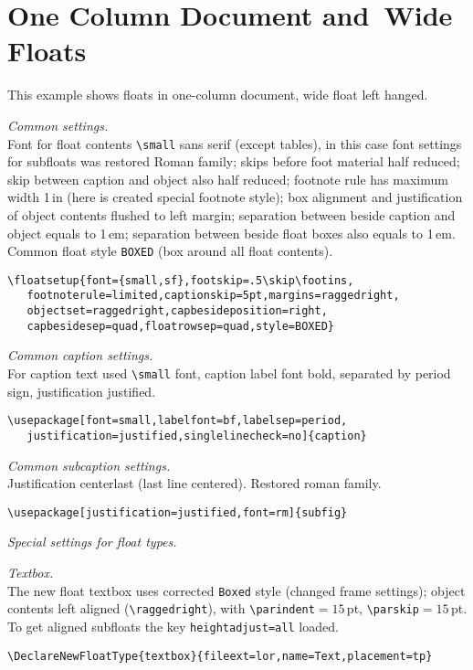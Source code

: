 \documentclass{book}
\begin{document}
\chapter{One Column Document and~Wide Floats}

\begin{sl}
This example shows floats in one-column document, wide float left hanged.

\emph{Common settings.}\\
Font for float contents \verb|\small| sans serif (except tables),
in this case font settings for subfloats was restored Roman family;
skips before foot material half reduced;
skip between caption and object also half reduced;
footnote rule has maximum width 1\,in (here is created special footnote style);
box alignment and justification of object contents flushed to left margin;
separation between beside caption and object equals to 1\,em; separation
between beside float boxes also equals to 1\,em. Common float style
\texttt{BOXED} (box around all float contents).
\begin{verbatim}
\floatsetup{font={small,sf},footskip=.5\skip\footins,
   footnoterule=limited,captionskip=5pt,margins=raggedright,
   objectset=raggedright,capbesideposition=right,
   capbesidesep=quad,floatrowsep=quad,style=BOXED}
\end{verbatim}

\emph{Common caption settings.}\\
For caption text used \verb|\small| font, caption label font bold, separated
by period sign, justification justified.
\begin{verbatim}
\usepackage[font=small,labelfont=bf,labelsep=period,
   justification=justified,singlelinecheck=no]{caption}
\end{verbatim}

\emph{Common subcaption settings.}\\
Justification centerlast (last line centered). Restored roman family.
\begin{verbatim}
\usepackage[justification=justified,font=rm]{subfig}
\end{verbatim}

\emph{Special settings for float types.}

\emph{Textbox.}\\
The new float textbox uses corrected \texttt{Boxed} style (changed frame
settings); object contents left aligned (\verb|\raggedright|), with
\verb|\parindent|${{}=15}$\,pt, \verb|\parskip|${{}=15}$\,pt.
To get aligned subfloats the key \texttt{heightadjust=all} loaded.
\begin{verbatim}
\DeclareNewFloatType{textbox}{fileext=lor,name=Text,placement=tp}


\end{verbatim}
\end{sl}
\end{document}
